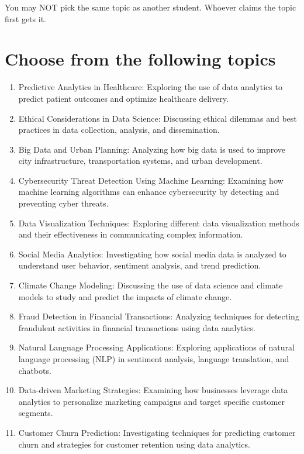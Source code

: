 \documentclass[12pt]{article}
\begin{document}
You may NOT pick the same topic as another student. Whoever claims the topic first gets it.

\section*{Choose from the following topics}

    \begin{enumerate}
        \item Predictive Analytics in Healthcare: Exploring the use of data analytics to predict patient outcomes and optimize healthcare delivery.
        \item Ethical Considerations in Data Science: Discussing ethical dilemmas and best practices in data collection, analysis, and dissemination.
        \item Big Data and Urban Planning: Analyzing how big data is used to improve city infrastructure, transportation systems, and urban development.
        \item Cybersecurity Threat Detection Using Machine Learning: Examining how machine learning algorithms can enhance cybersecurity by detecting and preventing cyber threats.
        \item Data Visualization Techniques: Exploring different data visualization methods and their effectiveness in communicating complex information.
        \item Social Media Analytics: Investigating how social media data is analyzed to understand user behavior, sentiment analysis, and trend prediction.
        \item Climate Change Modeling: Discussing the use of data science and climate models to study and predict the impacts of climate change.
        \item Fraud Detection in Financial Transactions: Analyzing techniques for detecting fraudulent activities in financial transactions using data analytics.
        \item Natural Language Processing Applications: Exploring applications of natural language processing (NLP) in sentiment analysis, language translation, and chatbots.
        \item Data-driven Marketing Strategies: Examining how businesses leverage data analytics to personalize marketing campaigns and target specific customer segments.
        \item Customer Churn Prediction: Investigating techniques for predicting customer churn and strategies for customer retention using data analytics.

\end{enumerate}
\end{document}
